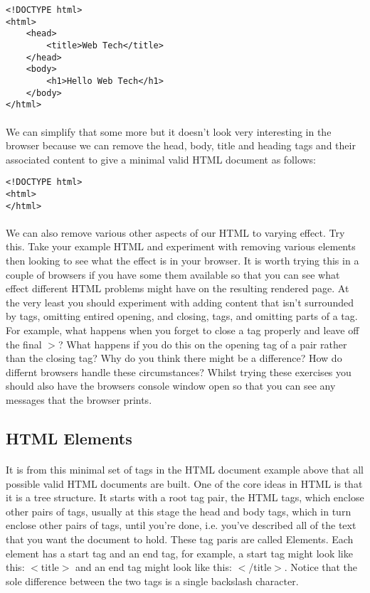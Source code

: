 \documentclass[10pt, a4paper]{article}
\begin{document}
\begin{lstlisting}
<!DOCTYPE html>
<html>
    <head>
        <title>Web Tech</title>
    </head>
    <body>
        <h1>Hello Web Tech</h1>
    </body>
</html>
\end{lstlisting}

\paragraph{} We can simplify that some more but it doesn't look very interesting in the browser because we can remove the head, body, title and heading tags and their associated content to give a minimal valid HTML document as follows:

\begin{lstlisting}
<!DOCTYPE html>
<html>
</html>
\end{lstlisting}

\paragraph{} We can also remove various other aspects of our HTML to varying effect. Try this. Take your example HTML and experiment with removing various elements then looking to see what the effect is in your browser. It is worth trying this in a couple of browsers if you have some them available so that you can see what effect different HTML problems might have on the resulting rendered page. At the very least you should experiment with adding content that isn't surrounded by tags, omitting entired opening, and closing, tags, and omitting parts of a tag. For example, what happens when you forget to close a tag properly and leave off the final $>$? What happens if you do this on the opening tag of a pair rather than the closing tag? Why do you think there might be a difference? How do differnt browsers handle these circumstances? Whilst trying these exercises you should also have the browsers console window open so that you can see any messages that the browser prints.

\subsection{HTML Elements}
\paragraph{} It is from this minimal set of tags in the HTML document example above that all possible valid HTML documents are built. One of the core ideas in HTML is that it is a tree structure. It starts with a root tag pair, the HTML tags, which enclose other pairs of tags, usually at this stage the head and body tags, which in turn enclose other pairs of tags, until you're done, i.e. you've described all of the text that you want the document to hold. These tag paris are called Elements. Each element has a start tag and an end tag, for example, a start tag might look like this: $<$title$>$ and an end tag might look like this: $<$/title$>$. Notice that the sole difference between the two tags is a single backslash character.
\end{document}
